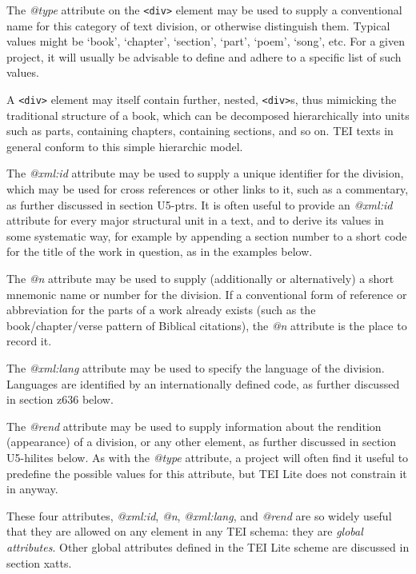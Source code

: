 \documentclass[11pt,twoside]{article}\makeatletter
\begin{document}
The \textit{@type} attribute on the \texttt{<div>} element may be used to supply a conventional name for this category of text division, or otherwise distinguish them.  Typical values might be ‘book’, ‘chapter’, ‘section’, ‘part’, ‘poem’, ‘song’, etc.  For a given project, it will usually be advisable to define and adhere to a specific list of such values.  \par
A \texttt{<div>} element may itself contain further, nested, \texttt{<div>}s, thus mimicking the traditional structure of a book, which can be decomposed hierarchically into units such as parts, containing chapters, containing sections, and so on. TEI texts in general conform to this simple hierarchic model.\par
 The \textit{@xml:id} attribute may be used to supply a unique identifier for the division, which may be used for cross references or other links to it, such as a commentary, as further discussed in section U5-ptrs. It is often useful to provide an \textit{@xml:id} attribute for every major structural unit in a text, and to derive its values in some systematic way, for example by appending a section number to a short code for the title of the work in question, as in the examples below.\par
The \textit{@n} attribute may be used to supply (additionally or alternatively) a short mnemonic name or number for the division.  If a conventional form of reference or abbreviation for the parts of a work already exists (such as the book/chapter/verse pattern of Biblical citations), the \textit{@n} attribute is the place to record it.\par
The \textit{@xml:lang} attribute may be used to specify the language of the division.  Languages are identified by an internationally defined code, as further discussed in section z636 below.\par
The \textit{@rend} attribute may be used to supply information about the rendition (appearance) of a division, or any other element, as further discussed in section U5-hilites below. As with the \textit{@type} attribute, a project will often find it useful to predefine the possible values for this attribute, but TEI Lite does not constrain it in anyway. \par
 These four attributes, \textit{@xml:id}, \textit{@n}, \textit{@xml:lang}, and \textit{@rend} are so widely useful that they are allowed on any element in any TEI schema: they are \emph{global attributes}.  Other global attributes defined in the TEI Lite scheme are discussed in section xatts.\par
\end{document}
